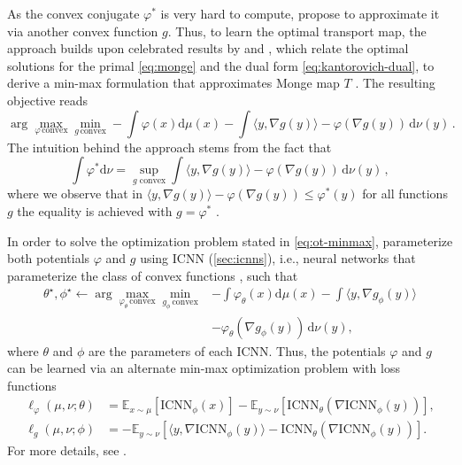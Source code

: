 As the convex conjugate $\varphi^*$ is very hard to compute, \citet{makkuva2020optimal} propose to approximate it via another convex function $g$.
Thus, to learn the optimal transport map, the approach builds upon celebrated results by \citet{knott1984optimal} and \citet{brenier1991polar}, which relate the optimal solutions for the primal \eqref{eq:monge} and the dual form \eqref{eq:kantorovich-dual}, to derive a min-max formulation that approximates Monge map $T$ \citep[Theorem 3.3]{makkuva2020optimal}.
The resulting objective reads
\begin{equation} \label{eq:ot-minmax}
	\arg \max_{\varphi  \, \text{convex}} \min_{g \, \text{convex}}  -\int \varphi(x) \mathrm{d} \mu(x) -\int \langle y, \nabla g(y)\rangle - \varphi(\nabla g(y)) \,\mathrm{d} \nu(y)\,.
\end{equation}
The intuition behind the approach stems from the fact that
\begin{equation*}
	\int \varphi^*\textrm{d}\nu = \sup _{g \text{ convex}} \int \langle y, \nabla g(y)\rangle - \varphi(\nabla g(y))\,\mathrm{d} \nu(y)\,,
\end{equation*}
where we observe that in $\langle y, \nabla g(y)\rangle - \varphi(\nabla g(y)) \leq \varphi^*(y)$ for all functions $g$ the equality is achieved with $g = \varphi^*$ \citep[Theorem 3.3]{makkuva2020optimal}. 

In order to solve the optimization problem stated in \eqref{eq:ot-minmax}, \citet{makkuva2020optimal} parameterize both potentials $\varphi$ and $g$ using \acrfull{ICNN} (\cref{sec:icnns}), i.e., neural networks that parameterize the class of convex functions \citep{amos2017input}, such that
\begin{align} \label{eq:cellot-optim}
	\nonumber \theta^\star, \phi^\star \leftarrow \arg \max_{\varphi_\theta  \, \text{convex}} \min_{g_\phi \, \text{convex}}  &-\int \varphi_\theta(x) \mathrm{d} \mu(x) -\int \langle y, \nabla g_\phi(y)\rangle \\
	&- \varphi_\theta(\nabla g_\phi(y)) \,\mathrm{d} \nu(y),
\end{align}
where $\theta$ and $\phi$ are the parameters of each \acrshort{ICNN}.
Thus, the potentials $\varphi$ and $g$ can be learned via an alternate min-max optimization problem with loss functions
\begin{align} 
	\label{eq:makkuva_f_loss}
    \ell_\varphi(\mu, \nu; \theta) &= \mathbb{E}_{x \sim \mu}[\text{ICNN}_{\phi}(x)] - \mathbb{E}_{y \sim \nu}[\text{ICNN}_{\theta}(\nabla \text{ICNN}_{\phi}(y))],   \\
    \label{eq:makkuva_g_loss}
    \ell_g(\mu, \nu; \phi) &= -\mathbb{E}_{y \sim \nu}[\langle y, \nabla \text{ICNN}_{\phi}(y)\rangle-\text{ICNN}_{\theta}(\nabla \text{ICNN}_{\phi}(y))].
\end{align}
For more details, see \citet{makkuva2020optimal, korotin2021neural}.


